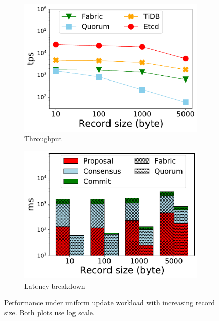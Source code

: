 \begin{figure}[tp]
	\centering
	\begin{subfigure}{0.45\textwidth}
		\includegraphics[width=0.99\textwidth]{chart/twin/record-size-thruput.pdf}        
		\caption{Throughput}
		\label{chart:twin:record-size-thruput}
	\end{subfigure}
	\begin{subfigure}{0.45\textwidth}
		\includegraphics[width=0.99\textwidth]{chart/twin/record-size-breakdown.pdf}     
		\caption{Latency breakdown}
		\label{chart:twin:record-size-breakdown}
	\end{subfigure}
	\caption{Performance under uniform update workload with increasing record size.
	Both plots use log scale.}
\end{figure}

